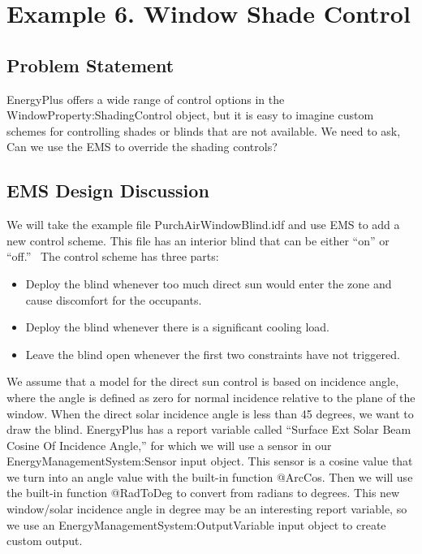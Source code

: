 \section{Example 6. Window Shade Control}\label{example-6.-window-shade-control}

\subsection{Problem Statement}\label{problem-statement-008}

EnergyPlus offers a wide range of control options in the WindowProperty:ShadingControl object, but it is easy to imagine custom schemes for controlling shades or blinds that are not available. We need to ask, Can we use the EMS to override the shading controls?

\subsection{EMS Design Discussion}\label{ems-design-discussion-008}

We will take the example file PurchAirWindowBlind.idf and use EMS to add a new control scheme. This file has an interior blind that can be either ``on'' or ``off.''~ The control scheme has three parts:

\begin{itemize}
\item
  Deploy the blind whenever too much direct sun would enter the zone and cause discomfort for the occupants.
\item
  Deploy the blind whenever there is a significant cooling load.
\item
  Leave the blind open whenever the first two constraints have not triggered.
\end{itemize}

We assume that a model for the direct sun control is based on incidence angle, where the angle is defined as zero for normal incidence relative to the plane of the window. When the direct solar incidence angle is less than 45 degrees, we want to draw the blind. EnergyPlus has a report variable called ``Surface Ext Solar Beam Cosine Of Incidence Angle,'' for which we will use a sensor in our EnergyManagementSystem:Sensor input object. This sensor is a cosine value that we turn into an angle value with the built-in function @ArcCos. Then we will use the built-in function @RadToDeg to convert from radians to degrees. This new window/solar incidence angle in degree may be an interesting report variable, so we use an EnergyManagementSystem:OutputVariable input object to create custom output.


